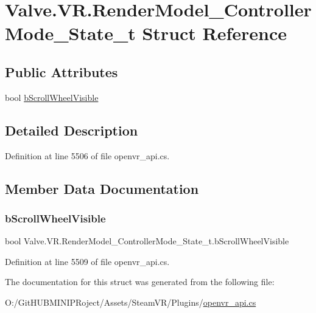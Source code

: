 \hypertarget{struct_valve_1_1_v_r_1_1_render_model___controller_mode___state__t}{}\section{Valve.\+V\+R.\+Render\+Model\+\_\+\+Controller\+Mode\+\_\+\+State\+\_\+t Struct Reference}
\label{struct_valve_1_1_v_r_1_1_render_model___controller_mode___state__t}
\subsection*{Public Attributes}
\begin{DoxyCompactItemize}
\item 
bool \mbox{\hyperlink{struct_valve_1_1_v_r_1_1_render_model___controller_mode___state__t_a3593ec81974754dd4776bc7b583da8df}{b\+Scroll\+Wheel\+Visible}}
\end{DoxyCompactItemize}


\subsection{Detailed Description}


Definition at line 5506 of file openvr\+\_\+api.\+cs.



\subsection{Member Data Documentation}
\mbox{\label{struct_valve_1_1_v_r_1_1_render_model___controller_mode___state__t_a3593ec81974754dd4776bc7b583da8df}} 
\subsubsection{\texorpdfstring{bScrollWheelVisible}{bScrollWheelVisible}}
{\footnotesize\ttfamily bool Valve.\+V\+R.\+Render\+Model\+\_\+\+Controller\+Mode\+\_\+\+State\+\_\+t.\+b\+Scroll\+Wheel\+Visible}



Definition at line 5509 of file openvr\+\_\+api.\+cs.



The documentation for this struct was generated from the following file\+:\begin{DoxyCompactItemize}
\item 
O\+:/\+Git\+H\+U\+B\+M\+I\+N\+I\+P\+Roject/\+Assets/\+Steam\+V\+R/\+Plugins/\mbox{\hyperlink{openvr__api_8cs}{openvr\+\_\+api.\+cs}}\end{DoxyCompactItemize}

